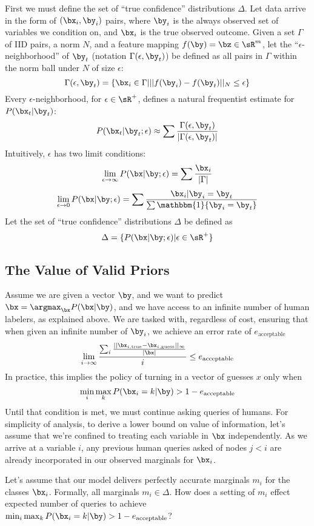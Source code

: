 First we must define the set of ``true confidence'' distributions $\Delta$.
Let data arrive in the form of $(\bx_i,\by_i)$ pairs, where $\by_i$ is the always observed set of variables we condition on, and $\bx_i$ is the true observed outcome.
Given a set $\Gamma$ of IID pairs, a norm $N$, and a feature mapping $f(\by) = \bz \in \sR^m$,
 let the ``$\epsilon$-neighborhood'' of $\by_t$ (notation $\Gamma(\epsilon, \by_t)$) be defined as all pairs in $\Gamma$ within the norm ball under $N$ of size $\epsilon$:
\[\Gamma(\epsilon, \by_t) = \{\bx_i \in \Gamma | ||f(\by_i) - f(\by_t)||_N \leq \epsilon\}\]
Every $\epsilon$-neighborhood, for $\epsilon \in \sR^+$, defines a natural frequentist estimate for $P(\bx_t | \by_t)$:
\[P(\bx_t | \by_t; \epsilon) \approx \sum \frac{\Gamma(\epsilon, \by_t)}{|\Gamma(\epsilon, \by_t)|}\]
Intuitively, $\epsilon$ has two limit conditions:
\[\lim_{\epsilon\to\infty} P(\bx | \by; \epsilon) = \sum \frac{\bx_i}{|\Gamma|}\]
\[\lim_{\epsilon\to0} P(\bx | \by; \epsilon) = \sum \frac{\bx_i | \by_i = \by_t}{\sum \mathbbm{1}\{\by_i = \by_t\}}\]
Let the set of ``true confidence'' distributions $\Delta$ be defined as
\[\Delta = \{P(\bx | \by; \epsilon) | \epsilon \in \sR^+\}\]

\subsection{The Value of Valid Priors}

Assume we are given a vector $\by$, and we want to predict $\bx = \argmax_{\bx} P(\bx | \by)$, and we have access to an infinite number of human labelers, as explained above.
We are tasked with, regardless of cost, ensuring that when given an infinite number of $\by_i$, we achieve an error rate of $e_{\text{acceptable}}$
\[\lim_{i\to\infty} \frac{\sum_i \frac{||\bx_{i,\text{true}} - \bx_{i,\text{guess}}||_{\infty}}{|\bx|}}{i} \leq e_{\text{acceptable}}\]
In practice, this implies the policy of turning in a vector of guesses $x$ only when
\[\min_{i} \max_{k} P(\bx_i = k | \by) > 1 - e_{\text{acceptable}}\]
Until that condition is met, we must continue asking queries of humans.
For simplicity of analysis, to derive a lower bound on value of information, let's assume that we're confined to treating each variable in $\bx$ independently.
As we arrive at a variable $i$, any previous human queries asked of nodes $j < i$ are already incorporated in our observed marginals for $\bx_i$.

Let's assume that our model delivers perfectly accurate marginals $m_i$ for the classes $\bx_i$.
Formally, all marginals $m_i \in \Delta$.
How does a setting of $m_i$ effect expected number of queries to achieve $\min_{i} \max_{k} P(\bx_i = k | \by) > 1 - e_{\text{acceptable}}$?


